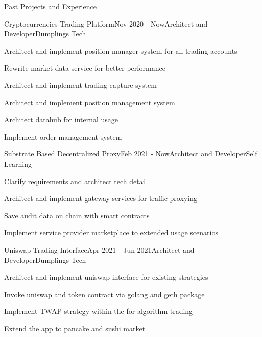 \documentclass{resume} %
\begin{document}
\begin{rSection}{Past Projects and Experience}

\begin{rSubsection}{Cryptocurrencies Trading Platform}{Nov 2020 - Now}{Architect and Developer}{Dumplings Tech}
\begin{rSubsectionList}
\item Architect and implement position manager system for all trading accounts
\item Rewrite market data service for better performance
\item Architect and implement trading capture system
\item Architect and implement position management system
\item Architect datahub for internal usage
\item Implement order management system
\end{rSubsectionList}
\end{rSubsection}

\begin{rSubsection}{Substrate Based Decentralized Proxy}{Feb 2021 - Now}{Architect and Developer}{Self Learning}
\begin{rSubsectionList}
\item Clarify requirements and architect tech detail 
\item Architect and implement gateway services for traffic proxying
\item Save audit data on chain with smart contracts
\item Implement service provider marketplace to extended usage scenarios
\end{rSubsectionList}
\end{rSubsection}

\begin{rSubsection}{Uniswap Trading Interface}{Apr 2021 - Jun 2021}{Architect and Developer}{Dumplings Tech}
\begin{rSubsectionList}
\item Architect and implement uniswap interface for existing strategies
\item Invoke uniswap and token contract via golang and geth package
\item Implement TWAP strategy within the for algorithm trading
\item Extend the app to pancake and sushi market
\end{rSubsectionList}
\end{rSubsection}



\end{rSection}
\end{document}
